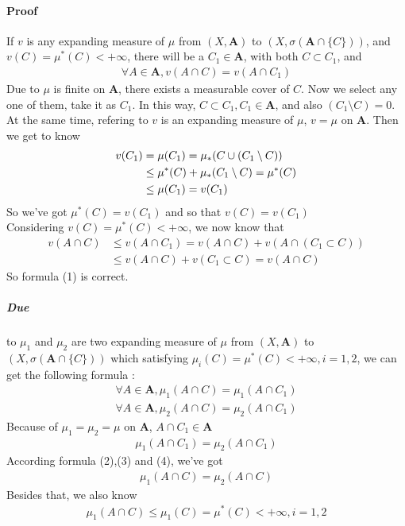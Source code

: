 \documentclass[UTF8]{ctexart}
\theoremstyle{definition}
\begin{document}
\paragraph{Proof} If $v$ is any expanding measure of $\mu$ from $(X,\bm{A})$ to $(X,\sigma(\bm{A}\cap\{C\}))$, and $v(C) = \mu^{*}(C) < +\infty$, there will be a $C_1 \in \bm{A}$, with both $C\subset C_1$, and 
\begin{align}
	\forall A\in \bm{A},v(A\cap C) = v(A\cap C_1)
\end{align}
Due to $\mu$ is finite on $\bm{A}$, there exists a measurable cover of $C$. Now we select any one of them, take it as $C_1$. In this way, $C\subset C_1,C_1\in\bm{A}$, and also $(C_1\setminus C)=0$. At the same time, refering to $v$ is an expanding measure of $\mu$, $v=\mu$ on $\bm{A}$. Then we get to know
\begin{align*}
	v(C_1) &= \mu(C_1) = \mu_{*}(C \cup (C_1 \setminus C))\notag\\
	&\leq \mu^{*}(C) + \mu_{*}(C_1 \setminus C) = \mu^{*}(C)\notag\\
	&\leq \mu(C_1) = v(C_1) 
\end{align*}
So we've got $\mu^{*}(C) = v(C_1)$ and so that $v(C) = v(C_1)$\\
Considering $v(C) = \mu^{*}(C) < +\infty$, we now know that
\begin{align*}
	v(A\cap C) &\leq v(A\cap C_1) = v(A\cap C) + v(A\cap(C_1\subset C))\\         &\leq v(A\cap C) + v(C_1\subset C) = v(A\cap C)
\end{align*}
So formula (1) is correct.\\
\subparagraph{Due} to $\mu_1$ and $\mu_2$ are two expanding measure of $\mu$ from $(X,\bm{A})$ to $(X,\sigma(\bm{A}\cap\{C\}))$ which satisfying $\mu_i(C) = \mu^{*}(C) < +\infty,i=1,2$, we can get the following formula :
\begin{align}
	\forall A\in \bm{A},\mu_1(A\cap C) = \mu_1(A\cap C_1)\\
	\forall A\in \bm{A},\mu_2(A\cap C) = \mu_2(A\cap C_1)
\end{align}
Because of $\mu_1 = \mu_2 = \mu$ on $\bm{A}$, $A\cap C_1 \in \bm{A}$
\begin{align}
	\mu_1(A\cap C_1) = \mu_2(A\cap C_1)
\end{align}
According formula (2),(3) and (4), we've got
\begin{align}
	\mu_1(A\cap C) = \mu_2(A\cap C)
\end{align}
Besides that, we also know
\begin{align*}
	\mu_1(A\cap C) \leq \mu_1(C) = \mu^{*}(C) < +\infty,i=1,2
\end{align*}
\end{document}
